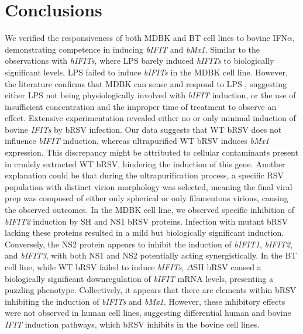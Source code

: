 \section{Conclusions} \label{sec:Conclusions Chapter2}
We verified the responsiveness of both MDBK and BT cell lines to bovine IFN$\alpha$, demonstrating competence in inducing \textit{bIFIT} and \textit{bMx1}. Similar to the observations with \textit{hIFITs}, where LPS barely induced \textit{hIFITs} to biologically significant levels, LPS failed to induce \textit{bIFITs} in the MDBK cell line. However, the literature confirms that MDBK can sense and respond to LPS \cite{Cui2022ThePathway}, suggesting either LPS not being physiologically involved with \textit{bIFIT} induction, or the use of insufficient concentration and the improper time of treatment to observe an effect. Extensive experimentation revealed either no or only minimal induction of bovine \textit{IFITs} by bRSV infection. Our data suggests that WT bRSV does not influence \textit{bIFIT} induction, whereas ultrapurified WT bRSV induces \textit{bMx1} expression. This discrepancy might be attributed to cellular contaminants present in crudely extracted WT bRSV, hindering the induction of this gene. Another explanation could be that during the ultrapurification process, a specific RSV population with distinct virion morphology was selected, meaning the final viral prep was composed of either only spherical or only filamentous virions, causing the observed outcomes. In the MDBK cell line, we observed specific inhibition of \textit{bIFIT2} induction by SH and NS1 bRSV proteins. Infection with mutant bRSV lacking these proteins resulted in a mild but biologically significant induction. Conversely, the NS2 protein appears to inhibit the induction of \textit{bIFIT1}, \textit{bIFIT2}, and \textit{bIFIT3}, with both NS1 and NS2 potentially acting synergistically. In the BT cell line, while WT bRSV failed to induce \textit{bIFITs}, $\Delta$SH bRSV caused a biologically significant downregulation of \textit{bIFIT} mRNA levels, presenting a puzzling phenotype. Collectively, it appears that there are elements within bRSV inhibiting the induction of \textit{bIFITs} and \textit{bMx1}. However, these inhibitory effects were not observed in human cell lines, suggesting differential human and bovine \textit{IFIT} induction pathways, which bRSV inhibits in the bovine cell lines.

